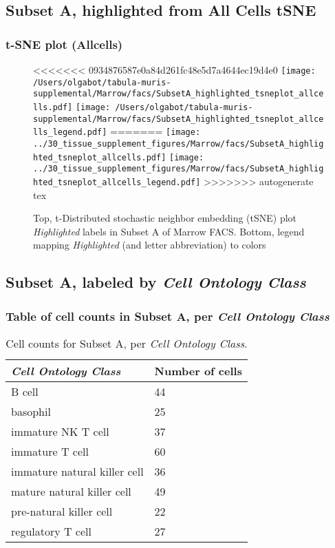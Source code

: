 \clearpage
\subsection{Subset A, highlighted from All Cells tSNE}
\subsubsection{t-SNE plot (Allcells)}
\begin{figure}[h]
\centering
<<<<<<< 0934876587e0a84d261fc48e5d7a4644ec19d4e0
\texttt{[image: /Users/olgabot/tabula-muris-supplemental/Marrow/facs/SubsetA\_highlighted\_tsneplot\_allcells.pdf]}
\texttt{[image: /Users/olgabot/tabula-muris-supplemental/Marrow/facs/SubsetA\_highlighted\_tsneplot\_allcells\_legend.pdf]}
=======
\texttt{[image: ../30\_tissue\_supplement\_figures/Marrow/facs/SubsetA\_highlighted\_tsneplot\_allcells.pdf]}
\texttt{[image: ../30\_tissue\_supplement\_figures/Marrow/facs/SubsetA\_highlighted\_tsneplot\_allcells\_legend.pdf]}
>>>>>>> autogenerate tex
\caption{Top, t-Distributed stochastic neighbor embedding (tSNE) plot  \emph{Highlighted} labels in Subset A of Marrow FACS. Bottom, legend mapping \emph{Highlighted} (and letter abbreviation) to colors}
\end{figure}


\clearpage

\subsection{Subset A, labeled by \emph{Cell Ontology Class}}
\subsubsection{Table of cell counts in Subset A, per \emph{Cell Ontology Class}}\begin{table}[h]
\centering
\label{my-label}
\begin{tabular}{@{}ll@{}}
\toprule

\emph{Cell Ontology Class}& Number of cells \\ \midrule
B cell & 44 \\

basophil & 25 \\

immature NK T cell & 37 \\

immature T cell & 60 \\

immature natural killer cell & 36 \\

mature natural killer cell & 49 \\

pre-natural killer cell & 22 \\

regulatory T cell & 27 \\
\bottomrule
\end{tabular}
\caption{Cell counts for Subset A, per \emph{Cell Ontology Class}.}
\end{table}

